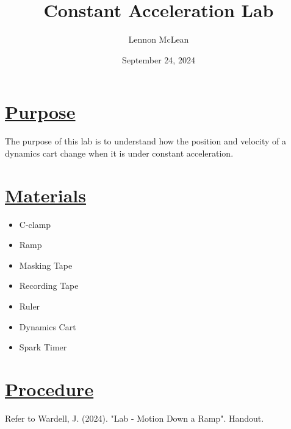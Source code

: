 \documentclass[letterpaper,12pt]{article}
\title{Constant Acceleration Lab}
\author{Lennon McLean}
\date{September 24, 2024}
\begin{document}
\maketitle

\section*{\underline{Purpose}}
The purpose of this lab is to understand how the position and velocity of a dynamics cart change when it is under constant acceleration.

\section*{\underline{Materials}}
\begin{itemize}
    \item C-clamp
    \item Ramp
    \item Masking Tape
    \item Recording Tape
    \item Ruler
    \item Dynamics Cart
    \item Spark Timer
\end{itemize}

\section*{\underline{Procedure}}
Refer to Wardell, J. (2024). "Lab - Motion Down a Ramp". Handout.
\end{document}
